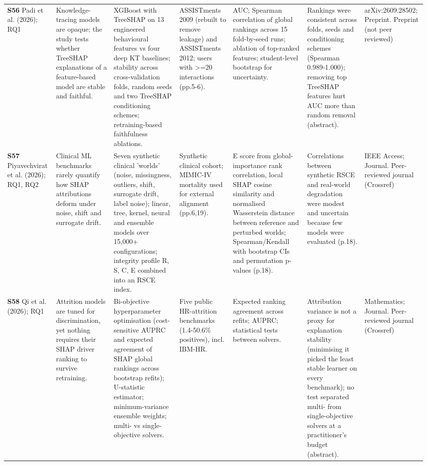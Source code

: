 \begin{longtable}{@{}P{1.55cm}P{2.9cm}P{4.5cm}P{3.2cm}P{3.4cm}P{4.6cm}P{3.6cm}@{}}
\textbf{S56} \cite{S56} Padi et al. (2026); RQ1 & Knowledge-tracing models are opaque; the study tests whether TreeSHAP explanations of a feature-based model are stable and faithful. & XGBoost with TreeSHAP on 13 engineered behavioural features vs four deep KT baselines; stability across cross-validation folds, random seeds and two TreeSHAP conditioning schemes; retraining-based faithfulness ablations. & ASSISTments 2009 (rebuilt to remove leakage) and ASSISTments 2012; users with \textgreater{}=20 interactions (pp.5-6). & AUC; Spearman correlation of global rankings across 15 fold-by-seed runs; ablation of top-ranked features; student-level bootstrap for uncertainty. & Rankings were consistent across folds, seeds and conditioning schemes (Spearman 0.989-1.000); removing top TreeSHAP features hurt AUC more than random removal (abstract). & arXiv:2609.28502; Preprint. Preprint (not peer reviewed) \\
\textbf{S57} \cite{S57} Piyavechvirat et al. (2026); RQ1, RQ2 & Clinical ML benchmarks rarely quantify how SHAP attributions deform under noise, shift and surrogate drift. & Seven synthetic clinical 'worlds' (noise, missingness, outliers, shift, surrogate drift, label noise); linear, tree, kernel, neural and ensemble models over 15,000+ configurations; integrity profile R, S, C, E combined into an RSCE index. & Synthetic clinical cohort; MIMIC-IV mortality used for external alignment (pp.6,19). & E score from global-importance rank correlation, local SHAP cosine similarity and normalised Wasserstein distance between reference and perturbed worlds; Spearman/\allowbreak{}Kendall with bootstrap CIs and permutation p-values (p.18). & Correlations between synthetic RSCE and real-world degradation were modest and uncertain because few models were evaluated (p.18). & IEEE Access; Journal. Peer-reviewed journal (Crossref) \\
\textbf{S58} \cite{S58} Qi et al. (2026); RQ1 & Attrition models are tuned for discrimination, yet nothing requires their SHAP driver ranking to survive retraining. & Bi-objective hyperparameter optimisation (cost-sensitive AUPRC and expected agreement of SHAP global rankings across bootstrap refits); U-statistic estimator; minimum-variance ensemble weights; multi- vs single-objective solvers. & Five public HR-attrition benchmarks (1.4-50.6\% positives), incl. IBM-HR. & Expected ranking agreement across refits; AUPRC; statistical tests between solvers. & Attribution variance is not a proxy for explanation stability (minimising it picked the least stable learner on every benchmark); no test separated multi- from single-objective solvers at a practitioner's budget (abstract). & Mathematics; Journal. Peer-reviewed journal (Crossref) \\

\end{longtable}
